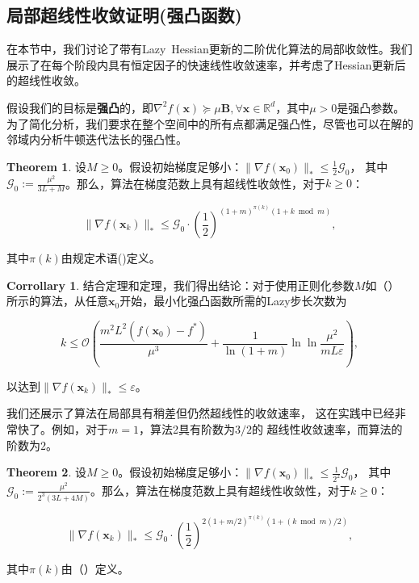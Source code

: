 \documentclass[a4paper,twoside,AutoFakeBold]{article}
\theoremstyle{definition}
\newtheorem{corr2}{{Corrollary}}[section]
\newtheorem{thrm2}{{Theorem}}[section]
\begin{document}
\subsection{局部超线性收敛证明(强凸函数)}\label{sec:5}


在本节中，我们讨论了带有Lazy\ Hessian更新的二阶优化算法的局部收敛性。我们展示了在每个阶段内具有恒定因子的快速线性收敛速率，并考虑了Hessian更新后的超线性收敛。

假设我们的目标是\textbf{强凸}的，即\(\nabla^2 f(\mathbf{x}) \succeq \mu \mathbf{B}, \forall \mathbf{x} \in \mathbb{R}^d\)，其中\(\mu > 0\)是强凸参数。为了简化分析，我们要求在整个空间中的所有点都满足强凸性，尽管也可以在解的邻域内分析牛顿迭代法长的强凸性。

\begin{mdframed}
\begin{thrm2}\label{thrm:5.1}
设\(M \geq 0\)。假设初始梯度足够小：\(\|\nabla f(\mathbf{x}_0)\|_* \leq \frac{1}{2} \mathcal{G}_0\)，
其中\(\mathcal{G}_0 := \frac{\mu^2}{3L + M}\)。那么，算法在梯度范数上具有超线性收敛性，对于\(k \geq 0\)：

\[
\|\nabla f(\mathbf{x}_k)\|_* \leq \mathcal{G}_0 \cdot \left( \frac{1}{2} \right)^{(1 + m)^{\pi(k)} (1 + k \bmod m)},
\]

其中\(\pi(k)\)由规定术语()定义。
\end{thrm2}
\end{mdframed}

\begin{corr2}\label{corr:5.2}
结合定理和定理，我们得出结论：对于使用正则化参数\(M\)如（）
所示的算法，从任意\(\mathbf{x}_0\)开始，最小化强凸函数所需的Lazy步长次数为

\[
k \leq \mathcal{O}\left( \frac{m^2 L^2 (f(\mathbf{x}_0) - f^*)}{\mu^3} + \frac{1}{\ln(1 + m)} \ln \ln \frac{\mu^2}{m L \varepsilon} \right),
\]

以达到\(\|\nabla f(\mathbf{x}_k)\|_* \leq \varepsilon\)。

我们还展示了算法在局部具有稍差但仍然超线性的收敛速率，
这在实践中已经非常快了。例如，对于\(m = 1\)，算法2具有阶数为\(3/2\)的
超线性收敛速率，而算法的阶数为\(2\)。
\end{corr2}

\begin{mdframed}
\begin{thrm2}\label{thrm:5.3}
设\(M \geq 0\)。假设初始梯度足够小：\(\|\nabla f(\mathbf{x}_0)\|_* \leq \frac{1}{2^2} \mathcal{G}_0\)，
其中\(\mathcal{G}_0 := \frac{\mu^2}{2^3 (3L + 4M)}\)。那么，算法在梯度范数上具有超线性收敛性，对于\(k \geq 0\)：

\[
\|\nabla f(\mathbf{x}_k)\|_* \leq \mathcal{G}_0 \cdot \left( \frac{1}{2} \right)^{2(1 + m/2)^{\pi(k)}(1 + (k \bmod m)/2)} ,
\]

其中\(\pi(k)\)由（）定义。
\end{thrm2}
\end{mdframed}
\end{document}
